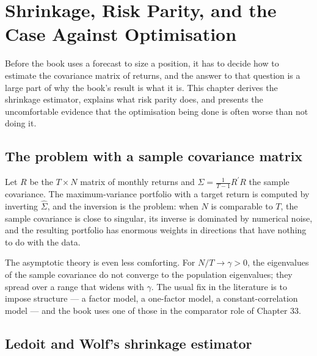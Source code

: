 
\chapter{Shrinkage, Risk Parity, and the Case Against Optimisation}
\label{ch:shrinkage}

Before the book uses a forecast to size a position, it has to decide how to
estimate the covariance matrix of returns, and the answer to that question
is a large part of why the book's result is what it is. This chapter
derives the shrinkage estimator, explains what risk parity does, and
presents the uncomfortable evidence that the optimisation being done is
often worse than not doing it.

\section{The problem with a sample covariance matrix}

Let \(R\) be the \(T \times N\) matrix of monthly returns and \(\hat\Sigma
= \frac{1}{T-1}R^{\prime}R\) the sample covariance. The maximum-variance
portfolio with a target return is computed by inverting \(\hat\Sigma\), and
the inversion is the problem: when \(N\) is comparable to \(T\), the
sample covariance is close to singular, its inverse is dominated by
numerical noise, and the resulting portfolio has enormous weights in
directions that have nothing to do with the data.

The asymptotic theory is even less comforting. For \(N/T \to \gamma > 0\), the
eigenvalues of the sample covariance do not converge to the population
eigenvalues; they spread over a range that widens with \(\gamma\). The
usual fix in the literature is to impose structure --- a factor model, a
one-factor model, a constant-correlation model --- and the book uses one of
those in the comparator role of Chapter 33.

\section{Ledoit and Wolf's shrinkage estimator}

